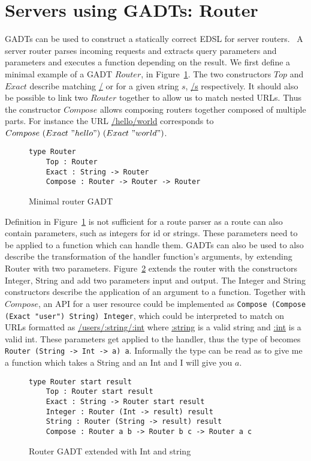 \section{Servers using GADTs: Router}\label{router}

GADTs can be used to construct a statically correct EDSL for server
routers.~\cite{evanrouter}
A server router parses incoming requests and extracts query parameters and
parameters and executes a function depending on the result. We first define a
minimal example of a GADT $Router$, in Figure~\ref{routergadtminimal}.  The two
constructors $Top$ and $Exact$ describe matching \url{/} or for a given string
$s$, \url{/s} respectively. It should also be possible to link two $Router$
together to allow us to match nested URLs. Thus the constructor $Compose$ allows
composing routers together composed of multiple parts.  For instance the URL
\url{/hello/world} corresponds to $Compose\ (Exact\ "hello")\ (Exact\ "world")$.

\begin{figure}[H]
    \begin{lstlisting}
type Router 
    Top : Router 
    Exact : String -> Router 
    Compose : Router -> Router -> Router
    \end{lstlisting}
    \caption{Minimal router GADT}
    \label{routergadtminimal}
\end{figure}


Definition in Figure~\ref{routergadtminimal} is not sufficient for a route
parser as a route can also contain parameters, such as integers for id or
strings. These parameters need to be applied to a function which can handle
them. GADTs can also be used to also describe the transformation of the handler
function's arguments, by extending Router with two parameters.
Figure~\ref{extendedrouter} extends the router with the constructors Integer,
String and add two parameters input and output. The Integer and String
constructors describe the application of an argument to a function. Together
with $Compose$, an API for a user resource could be implemented as
\texttt{Compose (Compose (Exact "user") String) Integer}, which could be
interpreted to match on URLs formatted as \url{/users/:string/:int} where
\url{:string} is a valid string and \url{:int} is a valid int. These parameters
get applied to the handler, thus the type of becomes \texttt{Router (String ->
Int -> a) a}. Informally the type can be read as to give me a function which
takes a String and an Int and I will give you $a$.

\begin{figure}[H]
    \begin{lstlisting}
type Router start result 
    Top : Router start result
    Exact : String -> Router start result
    Integer : Router (Int -> result) result
    String : Router (String -> result) result
    Compose : Router a b -> Router b c -> Router a c
    \end{lstlisting}
    \caption{Router GADT extended with Int and string}
    \label{extendedrouter}
\end{figure}

